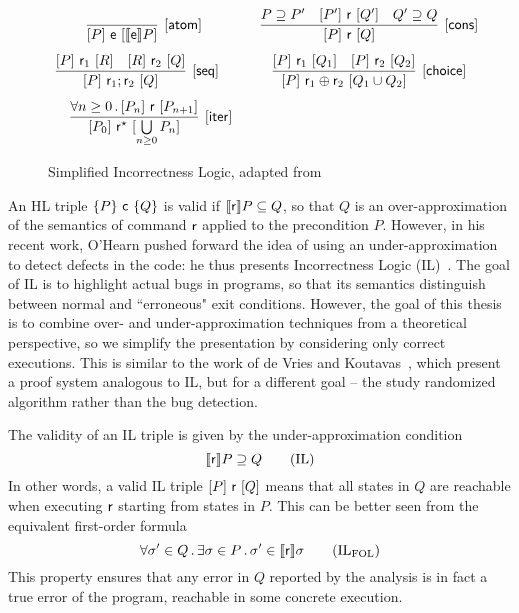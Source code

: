 \begin{figure}[t]
	\centering
	\begin{framed}
			\(
			\begin{array}{cc}
				\infer[\ilrule{atom}]
				{\undertriple{P}{\expe}{\denot{\expe}P}}
				{}
				\quad &
				\infer[\ilrule{cons}]
				{\undertriple{P}{\regr}{Q}}
				{P \supseteq P' & \undertriple{P'}{\regr}{Q'}& Q' \supseteq Q}
				\\[7.5pt]
				\infer[\ilrule{seq}]
				{\undertriple{P}{\regr_1;\regr_2}{Q}}
				{\undertriple{P}{\regr_1}{R} &
					\undertriple{R}{\regr_2}{Q}}
				\qquad &
				\infer[\ilrule{choice}]
				{\undertriple{P}{\regr_1 \regplus \regr_2}{Q_1 \cup Q_2}}
				{\undertriple{P}{\regr_1}{Q_1} & \undertriple{P}{\regr_2}{Q_2}}
				\\[7.5pt]
				\infer[\ilrule{iter}]
				{\undertriple{P_0}{\regr^\kstar}{\bigcup\limits_{n \ge 0} P_n}}
				{\forall n \ge 0 \sdot \undertriple{P_n}{\regr}{P_{n+1}}}
				&
			\end{array}
			\)
	\end{framed}
	\vspace{-1ex}
	\caption{Simplified Incorrectness Logic, adapted from~\cite{MOH21}}\label{fig:bg:il}
\end{figure}

An HL triple $\{P\}~\mathsf{c}~\{Q\}$ is valid if $\llbracket\mathsf{r}\rrbracket P \subseteq Q$, so that $Q$ is an over-approximation of the semantics of command $\mathsf{r}$ applied to the precondition $P$. However, in his recent work, O'Hearn pushed forward the idea of using an under-approximation to detect defects in the code: he thus presents Incorrectness Logic (IL)~\cite{OHearn20}.
The goal of IL is to highlight actual bugs in programs, so that its semantics distinguish between normal and ``erroneous" exit conditions. However, the goal of this thesis is to combine over- and under-approximation techniques from a theoretical perspective, so we simplify the presentation by considering only correct executions. This is similar to the work of de Vries and Koutavas~\cite{VK11}, which present a proof system analogous to IL, but for a different goal -- the study randomized algorithm rather than the bug detection.

The validity of an IL triple is given by the under-approximation condition
\[
\llbracket\mathsf{r}\rrbracket P \supseteq Q \tag{IL}\label{eq:bg:il-validity}
\]
In other words, a valid IL triple $[P]~\mathsf{r}~[Q]$ means that all states in $Q$ are reachable when executing $\mathsf{r}$ starting from states in $P$. This can be better seen from the equivalent first-order formula
\[
\forall \sigma' \in Q \sdot \exists \sigma \in P \sdot \sigma' \in \fwsem{\regr} \sigma \tag{IL$_{\text{FOL}}$}\label{eq:bg:il-fol}
\]
This property ensures that any error in $Q$ reported by the analysis is in fact a true error of the program, reachable in some concrete execution.


